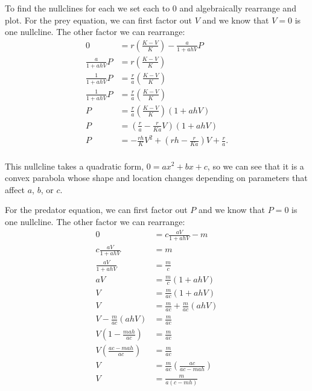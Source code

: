 \documentclass[11pt]{article}
\begin{document}
To find the nullclines for each we set each to 0 and algebraically rearrange and plot. For the prey equation, we can first factor out $V$ and we know that $V = 0$ is one nullcline. The other factor we can rearrange:
\begin{equation}
\begin{aligned}
    0 &= r\left(\frac{K - V}{K}\right) - \frac{a}{1 + ahV}P \\
     \frac{a}{1 + ahV}P &= r\left(\frac{K - V}{K}\right) \\
     \frac{1}{1 + ahV}P &= \frac{r}{a}\left(\frac{K - V}{K}\right) \\
     \frac{1}{1 + ahV}P &= \frac{r}{a}\left(\frac{K - V}{K}\right) \\
     P &= \frac{r}{a}\left(\frac{K - V}{K}\right)(1 + ahV) \\
     P &= \left(\frac{r}{a}-\frac{r}{Ka}V\right)(1 + ahV) \\
     P &= - \frac{rh}{K}V^2 + \left(rh-\frac{r}{Ka}\right)V + \frac{r}{a}. \\
\end{aligned}
\end{equation}

This nullcline takes a quadratic form, $0 = ax^2 + bx + c$, so we can see that it is a convex parabola whose shape and location changes depending on parameters that affect $a$, $b$, or $c$.

For the predator equation, we can first factor out $P$ and we know that $P = 0$ is one nullcline. The other factor we can rearrange:
\begin{equation}
\begin{aligned}
    0 &= c\frac{aV}{1 + ahV} - m \\
    c\frac{aV}{1 + ahV} &= m \\
    \frac{aV}{1 + ahV} &= \frac{m}{c} \\
    aV &= \frac{m}{c}\left(1 + ahV\right) \\
    V &= \frac{m}{ac}\left(1 + ahV\right) \\
    V &= \frac{m}{ac} + \frac{m}{ac}\left(ahV\right) \\
    V - \frac{m}{ac}\left(ahV\right) &= \frac{m}{ac}  \\
    V(1 -\frac{mah}{ac}) &= \frac{m}{ac}  \\
    V\left(\frac{ac - mah}{ac}\right) &= \frac{m}{ac}  \\
    V &= \frac{m}{ac}\left(\frac{ac}{ac - mah}\right)  \\
    V &= \frac{m}{a(c - mh)}  \\
\end{aligned}
\end{equation}
\end{document}
